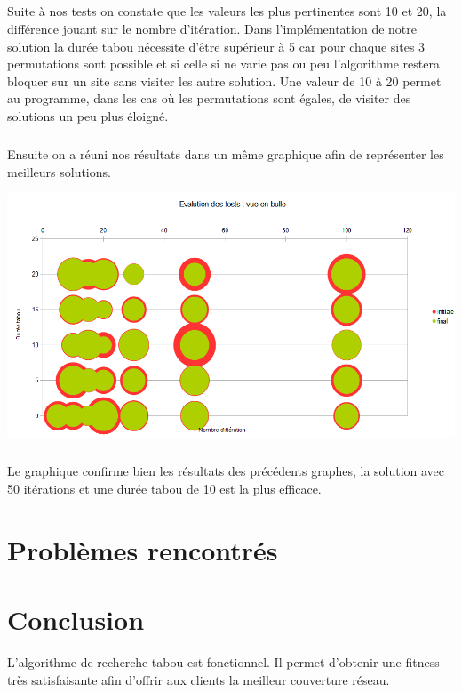 \documentclass[a4paper, 11pt]{report}
\begin{document}
    \paragraph{}Suite à nos tests on constate que les valeurs les plus pertinentes sont 10 et 20,
    la différence jouant sur le nombre d'itération. Dans l'implémentation de notre solution la durée
    tabou nécessite d'être supérieur à 5 car pour chaque sites 3 permutations sont possible et si
    celle si ne varie pas ou peu l'algorithme restera bloquer sur un site sans visiter les autre
    solution. Une valeur de 10 à 20 permet au programme, dans les cas où les permutations sont
    égales, de visiter des solutions un peu plus éloigné.


    \paragraph{}Ensuite on a réuni nos résultats dans un même graphique afin de représenter les
    meilleurs solutions.
    \begin{center} \includegraphics[width=14cm]{tableau_bubulle} \end{center}
    \paragraph{}Le graphique confirme bien les résultats des précédents graphes, la solution avec 50
    itérations et une durée tabou de 10 est la plus efficace.

\chapter{Problèmes rencontrés}

\chapter{Conclusion}
L'algorithme de recherche tabou est fonctionnel. Il permet d'obtenir une fitness très satisfaisante afin d'offrir aux clients la meilleur couverture réseau.
\end{document}
